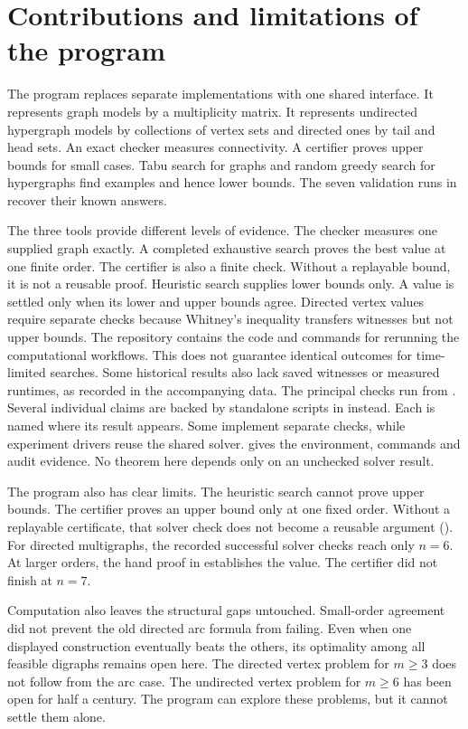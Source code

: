 \section{Contributions and limitations of the program}

The program replaces separate implementations with one shared interface.
It represents graph models by a multiplicity matrix.
It represents undirected hypergraph models by collections of vertex sets and directed ones by tail and head sets.
An exact checker measures connectivity.
A certifier proves upper bounds for small cases.
Tabu search for graphs and random greedy search for hypergraphs find examples and hence lower bounds.
The seven validation runs in  recover their known answers.

The three tools provide different levels of evidence.
The checker measures one supplied graph exactly.
A completed exhaustive search proves the best value at one finite order.
The certifier is also a finite check.
Without a replayable bound, it is not a reusable proof.
Heuristic search supplies lower bounds only.
A value is settled only when its lower and upper bounds agree.
Directed vertex values require separate checks because Whitney's inequality transfers witnesses but not upper bounds.
The repository contains the code and commands for rerunning the computational workflows.
This does not guarantee identical outcomes for time-limited searches. Some historical results also lack saved witnesses or measured runtimes, as recorded in the accompanying data.
The principal checks run from .
Several individual claims are backed by standalone scripts in  instead.
Each is named where its result appears. Some implement separate checks, while experiment drivers reuse the shared solver.
 gives the environment, commands and audit evidence.
No theorem here depends only on an unchecked solver result.

The program also has clear limits.
The heuristic search cannot prove upper bounds.
The certifier proves an upper bound only at one fixed order.
Without a replayable certificate, that solver check does not become a reusable argument ().
For directed multigraphs, the recorded successful solver checks reach only $n=6$.
At larger orders, the hand proof in  establishes the value.
The certifier did not finish at $n=7$.

Computation also leaves the structural gaps untouched.
Small-order agreement did not prevent the old directed arc formula from failing.
Even when one displayed construction eventually beats the others, its optimality among all feasible digraphs remains open here.
The directed vertex problem for $m\ge3$ does not follow from the arc case.
The undirected vertex problem for $m\ge6$ has been open for half a century.
The program can explore these problems, but it cannot settle them alone.

